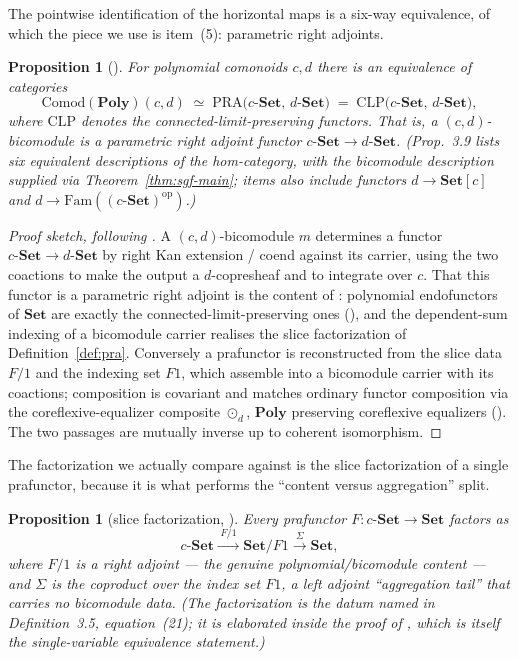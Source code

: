 \documentclass[11pt]{amsart}
\theoremstyle{plain}
\newtheorem{proposition}[theorem]{Proposition}
\theoremstyle{definition}
\newcommand{\Poly}{\mathbf{Poly}}
\newcommand{\Set}{\mathbf{Set}}
\newcommand{\Comod}{\mathrm{Comod}}
\newcommand{\PRA}{\mathrm{PRA}}
\newcommand{\CLP}{\mathrm{CLP}}
\newcommand{\Fam}{\mathrm{Fam}}
\newcommand{\op}{^{\mathrm{op}}}
\begin{document}
The pointwise identification of the horizontal maps is a six-way equivalence, of which the
piece we use is item~(5): parametric right adjoints.

\begin{proposition}[{\cite[Prop.~3.9(5), with Thm.~4.28]{SGF}}]\label{prop:sixway}
For polynomial comonoids $c,d$ there is an equivalence of categories
\[
\Comod(\Poly)(c,d)\;\simeq\;\PRA\bigl(c\text{-}\Set,\,d\text{-}\Set\bigr)
\;=\;\CLP\bigl(c\text{-}\Set,\,d\text{-}\Set\bigr),
\]
where $\CLP$ denotes the connected-limit-preserving functors. That is, a
$(c,d)$-bicomodule \emph{is} a parametric right adjoint functor $c\text{-}\Set\to
d\text{-}\Set$. (Prop.~3.9 lists six equivalent descriptions of the hom-category, with the
bicomodule description supplied via Theorem~\ref{thm:sgf-main}; items also include functors
$d\to\Set[c]$ and $d\to\Fam((c\text{-}\Set)\op)$.)
\end{proposition}

\begin{proof}[Proof sketch, following \cite{SGF}]
A $(c,d)$-bicomodule $m$ determines a functor $c\text{-}\Set\to d\text{-}\Set$ by right Kan
extension / coend against its carrier, using the two coactions to make the output a
$d$-copresheaf and to integrate over $c$. That this functor is a parametric right adjoint is
the content of \cite[\S2--\S3]{SGF}: polynomial endofunctors of $\Set$ are exactly the
connected-limit-preserving ones (\cite[Prop.~2.5]{SGF}), and the dependent-sum indexing of a
bicomodule carrier realises the slice factorization of Definition~\ref{def:pra}. Conversely a
prafunctor is reconstructed from the slice data $F/1$ and the indexing set $F1$, which assemble
into a bicomodule carrier with its coactions; composition is covariant and matches ordinary
functor composition via the coreflexive-equalizer composite $\odot_d$, $\Poly$ preserving
coreflexive equalizers (\cite[Lem.~2.19]{SGF}). The two passages are mutually inverse up to
coherent isomorphism.
\end{proof}

The factorization we actually compare against is the slice factorization of a single
prafunctor, because it is what performs the ``content versus aggregation'' split.

\begin{proposition}[slice factorization, {\cite[Def.~3.5, eq.~(21)]{SGF}}]\label{prop:factor}
Every prafunctor $F\colon c\text{-}\Set\to\Set$ factors as
\[
c\text{-}\Set \xrightarrow{\;F/1\;} \Set/F1 \xrightarrow{\;\Sigma\;} \Set,
\]
where $F/1$ is a \emph{right adjoint} --- the genuine polynomial/bicomodule content --- and
$\Sigma$ is the coproduct over the index set $F1$, a \emph{left adjoint} ``aggregation
tail'' that carries no bicomodule data. (The factorization is the datum named in
Definition~3.5, equation~(21); it is elaborated inside the proof of \cite[Prop.~3.6]{SGF},
which is itself the single-variable equivalence statement.)
\end{proposition}
\end{document}

